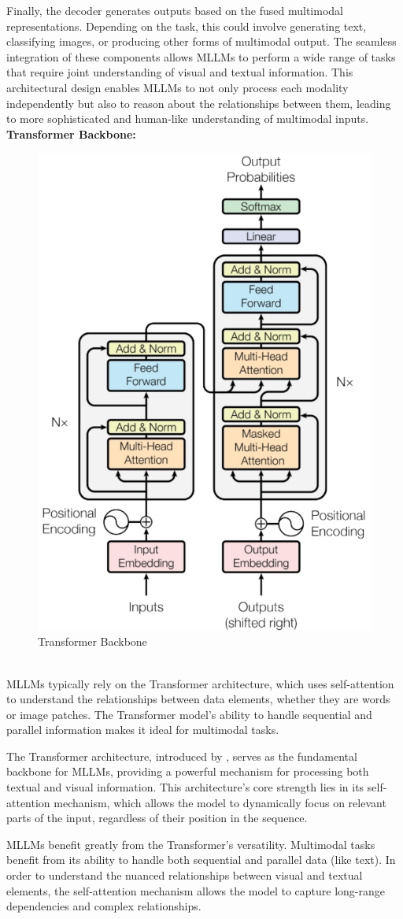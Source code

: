 Finally, the decoder generates outputs based on the fused multimodal representations. Depending on the task, this could involve generating text, classifying images, or producing other forms of multimodal output. The seamless integration of these components allows MLLMs to perform a wide range of tasks that require joint understanding of visual and textual information. This architectural design enables MLLMs to not only process each modality independently but also to reason about the relationships between them, leading to more sophisticated and human-like understanding of multimodal inputs.
\\
\textbf{Transformer Backbone:} 
\begin{figure}
    \centering
    \includegraphics[width=0.4\linewidth]{chapter2/transformer.pdf}
    \caption{Transformer Backbone}
    \label{fig:transformer}
\end{figure}
\\
MLLMs typically rely on the Transformer architecture, which uses self-attention to understand the relationships between data elements, whether they are words or image patches. The Transformer model’s ability to handle sequential and parallel information makes it ideal for multimodal tasks.

The Transformer architecture, introduced by \cite{vaswani2017attention}, serves as the fundamental backbone for MLLMs, providing a powerful mechanism for processing both textual and visual information. This architecture's core strength lies in its self-attention mechanism, which allows the model to dynamically focus on relevant parts of the input, regardless of their position in the sequence.

MLLMs benefit greatly from the Transformer's versatility. Multimodal tasks benefit from its ability to handle both sequential and parallel data (like text). In order to understand the nuanced relationships between visual and textual elements, the self-attention mechanism allows the model to capture long-range dependencies and complex relationships.

